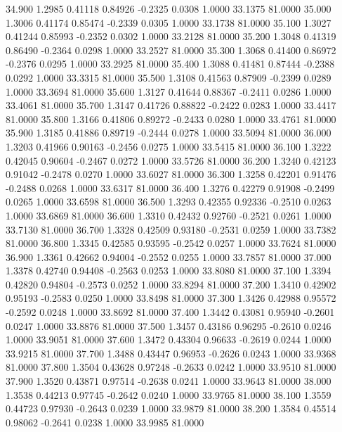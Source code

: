   34.900   1.2985   0.41118   0.84926  -0.2325   0.0308   1.0000  33.1375  81.0000
  35.000   1.3006   0.41174   0.85474  -0.2339   0.0305   1.0000  33.1738  81.0000
  35.100   1.3027   0.41244   0.85993  -0.2352   0.0302   1.0000  33.2128  81.0000
  35.200   1.3048   0.41319   0.86490  -0.2364   0.0298   1.0000  33.2527  81.0000
  35.300   1.3068   0.41400   0.86972  -0.2376   0.0295   1.0000  33.2925  81.0000
  35.400   1.3088   0.41481   0.87444  -0.2388   0.0292   1.0000  33.3315  81.0000
  35.500   1.3108   0.41563   0.87909  -0.2399   0.0289   1.0000  33.3694  81.0000
  35.600   1.3127   0.41644   0.88367  -0.2411   0.0286   1.0000  33.4061  81.0000
  35.700   1.3147   0.41726   0.88822  -0.2422   0.0283   1.0000  33.4417  81.0000
  35.800   1.3166   0.41806   0.89272  -0.2433   0.0280   1.0000  33.4761  81.0000
  35.900   1.3185   0.41886   0.89719  -0.2444   0.0278   1.0000  33.5094  81.0000
  36.000   1.3203   0.41966   0.90163  -0.2456   0.0275   1.0000  33.5415  81.0000
  36.100   1.3222   0.42045   0.90604  -0.2467   0.0272   1.0000  33.5726  81.0000
  36.200   1.3240   0.42123   0.91042  -0.2478   0.0270   1.0000  33.6027  81.0000
  36.300   1.3258   0.42201   0.91476  -0.2488   0.0268   1.0000  33.6317  81.0000
  36.400   1.3276   0.42279   0.91908  -0.2499   0.0265   1.0000  33.6598  81.0000
  36.500   1.3293   0.42355   0.92336  -0.2510   0.0263   1.0000  33.6869  81.0000
  36.600   1.3310   0.42432   0.92760  -0.2521   0.0261   1.0000  33.7130  81.0000
  36.700   1.3328   0.42509   0.93180  -0.2531   0.0259   1.0000  33.7382  81.0000
  36.800   1.3345   0.42585   0.93595  -0.2542   0.0257   1.0000  33.7624  81.0000
  36.900   1.3361   0.42662   0.94004  -0.2552   0.0255   1.0000  33.7857  81.0000
  37.000   1.3378   0.42740   0.94408  -0.2563   0.0253   1.0000  33.8080  81.0000
  37.100   1.3394   0.42820   0.94804  -0.2573   0.0252   1.0000  33.8294  81.0000
  37.200   1.3410   0.42902   0.95193  -0.2583   0.0250   1.0000  33.8498  81.0000
  37.300   1.3426   0.42988   0.95572  -0.2592   0.0248   1.0000  33.8692  81.0000
  37.400   1.3442   0.43081   0.95940  -0.2601   0.0247   1.0000  33.8876  81.0000
  37.500   1.3457   0.43186   0.96295  -0.2610   0.0246   1.0000  33.9051  81.0000
  37.600   1.3472   0.43304   0.96633  -0.2619   0.0244   1.0000  33.9215  81.0000
  37.700   1.3488   0.43447   0.96953  -0.2626   0.0243   1.0000  33.9368  81.0000
  37.800   1.3504   0.43628   0.97248  -0.2633   0.0242   1.0000  33.9510  81.0000
  37.900   1.3520   0.43871   0.97514  -0.2638   0.0241   1.0000  33.9643  81.0000
  38.000   1.3538   0.44213   0.97745  -0.2642   0.0240   1.0000  33.9765  81.0000
  38.100   1.3559   0.44723   0.97930  -0.2643   0.0239   1.0000  33.9879  81.0000
  38.200   1.3584   0.45514   0.98062  -0.2641   0.0238   1.0000  33.9985  81.0000
